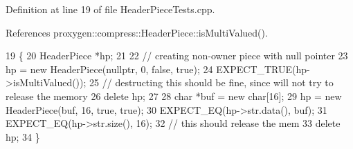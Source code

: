 Definition at line 19 of file Header\+Piece\+Tests.\+cpp.



References proxygen\+::compress\+::\+Header\+Piece\+::is\+Multi\+Valued().


\begin{DoxyCode}
19                                 \{
20   HeaderPiece *hp;
21 
22   \textcolor{comment}{// creating non-owner piece with null pointer}
23   hp = \textcolor{keyword}{new} HeaderPiece(\textcolor{keyword}{nullptr}, 0, \textcolor{keyword}{false}, \textcolor{keyword}{true});
24   EXPECT\_TRUE(hp->isMultiValued());
25   \textcolor{comment}{// destructing this should be fine, since will not try to release the memory}
26   \textcolor{keyword}{delete} hp;
27 
28   \textcolor{keywordtype}{char} *buf = \textcolor{keyword}{new} \textcolor{keywordtype}{char}[16];
29   hp = \textcolor{keyword}{new} HeaderPiece(buf, 16, \textcolor{keyword}{true}, \textcolor{keyword}{true});
30   EXPECT\_EQ(hp->str.data(), buf);
31   EXPECT\_EQ(hp->str.size(), 16);
32   \textcolor{comment}{// this should release the mem}
33   \textcolor{keyword}{delete} hp;
34 \}
\end{DoxyCode}
